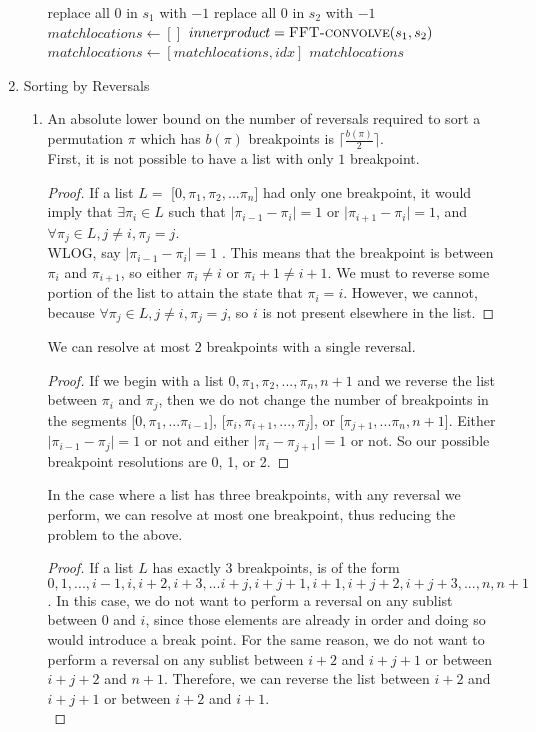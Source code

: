 \documentclass[a4paper]{article}
\begin{document}
\begin{enumerate}
\begin{enumerate}
		\begin{algorithmic}
		\State replace all $0$ in $s_1$ with $-1$
		\State replace all $0$ in $s_2$ with $-1$
		\State $matchlocations \gets [ ]$
		\State $innerproduct = \Call{FFT-convolve}{s_1, s_2 }$
				\State $matchlocations \gets [matchlocations, idx]$
			\EndIf
		\EndFor
		\State \Return $matchlocations$
		\end{algorithmic}
	\end{enumerate}
\item Sorting by Reversals
	\begin{enumerate}
	\item An absolute lower bound on the number of reversals required to sort a permutation $\pi$ which has $b(\pi)$ breakpoints is $\lceil \frac{b(\pi)}{2} \rceil$.\\
	First, it is not possible to have a list with only $1$ breakpoint.
	\begin{proof}
	If a list $L =$ [$0, \pi_1, \pi_2, ... \pi_n$] had only one breakpoint, it would imply that $\exists \pi_i \in L$ such that $\lvert \pi_{i-1} - \pi_i \rvert = 1$ or $\lvert \pi_{i+1} - \pi_i \rvert = 1$, and $\forall \pi_j \in L, j \neq i, \pi_j = j$.\\
	WLOG, say $\lvert \pi_{i-1} - \pi_i \rvert = 1$ .  This means that the breakpoint is between $\pi_i$ and $\pi_{i+1}$, so either $\pi_i \neq i$ or $\pi_i+1 \neq i+1$.  We must to reverse some portion of the list to attain the state that $\pi_i = i$.  However, we cannot, because $\forall \pi_j \in L, j \neq i, \pi_j = j$, so $i$ is not present elsewhere in the list.
	\end{proof}
	We can resolve at most $2$ breakpoints with a single reversal.
	\begin{proof}
	If we begin with a list $0, \pi_1, \pi_2, ... , \pi_n, n+1$ and we reverse the list between $\pi_i$ and $\pi_j$, then we do not change the number of breakpoints in the segments [$0, \pi_1, ... \pi_{i-1}$], [$\pi_i, \pi_{i+1}, ... , \pi_j$], or [$\pi_{j+1}, ... \pi_n, n+1$].  Either $\rvert \pi_{i-1} - \pi_j \lvert = 1$ or not and either $\rvert \pi_i - \pi_{j+1} \lvert = 1$ or not.  So our possible breakpoint resolutions are 0, 1, or 2.
	\end{proof}
	In the case where a list has three breakpoints, with any reversal we perform, we can resolve at most one breakpoint, thus reducing the problem to the above.
	\begin{proof}
	If a list $L$ has exactly $3$ breakpoints, is of the form $0, 1, ...,i-1, i, i+2, i+3, ... i+j, i+j+1, i+1, i+j+2, i+j+3, ..., n, n+1$.  In this case, we do not want to perform a reversal on any sublist between $0$ and $i$, since those elements are already in order and doing so would introduce a break point.  For the same reason, we do not want to perform a reversal on any sublist between $i+2$ and $i+j+1$ or between $i+j+2$ and $n+1$.  Therefore, we can reverse the list between $i+2$ and $i+j+1$ or between $i+2$ and $i+1$.\\

\end{proof}
\end{enumerate}
\end{enumerate}
\end{document}
